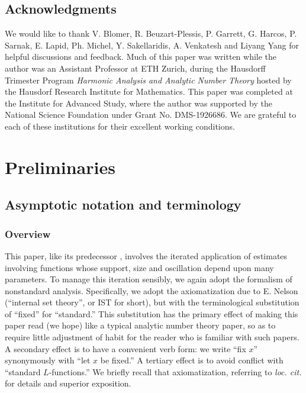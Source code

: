 \documentclass[reqno]{amsart}
\theoremstyle{plain} \newtheorem{theorem} {Theorem}
\theoremstyle{definition} \newtheorem{definition} [theorem] {Definition}
\theoremstyle{itplain} %
\numberwithin{equation}{section}
\numberwithin{theorem}{section}
\begin{document}
\subsection*{Acknowledgments}
We would like to thank V. Blomer, R. Beuzart-Plessis, P. Garrett, G. Harcos, P. Sarnak, E. Lapid, Ph. Michel, Y. Sakellaridis, A. Venkatesh and Liyang Yang for helpful discussions and feedback.  Much of this paper was written while the author was an Assistant Professor at ETH Zurich, during the Hausdorff Trimester Program \emph{Harmonic Analysis and Analytic Number Theory} hosted by the Hausdorf Research Institute for Mathematics.  This paper was completed at the Institute for Advanced Study, where the author was supported by the National Science Foundation under Grant No. DMS-1926686.  We are grateful to each of these institutions for their excellent working conditions.

\section{Preliminaries}\label{sec:preliminaries}

\subsection{Asymptotic notation and terminology}\label{sec:asympt-notat-term}
\subsubsection{Overview}\label{sec:asymptotic-notation-overview}
This paper, like its predecessor \cite{2020arXiv201202187N}, involves the iterated application of estimates involving functions whose support, size and oscillation depend upon many parameters.  To manage this iteration sensibly, we again adopt the formalism of nonstandard analysis.  Specifically, we adopt the axiomatization due to E. Nelson \cite{MR469763} (``internal set theory'', or IST for short), but with the terminological substitution of ``fixed'' for ``standard.''  This substitution has the primary effect of making this paper read (we hope) like a typical analytic number theory paper, so as to require little adjustment of habit for the reader who is familiar with such papers.  A secondary effect is to have a convenient verb form: we write ``fix $x$'' synonymously with ``let $x$ be fixed.''  A tertiary effect is to avoid conflict with ``standard $L$-functions.''  We briefly recall that axiomatization, referring to \emph{loc. cit.} for details and superior exposition.
\end{document}

